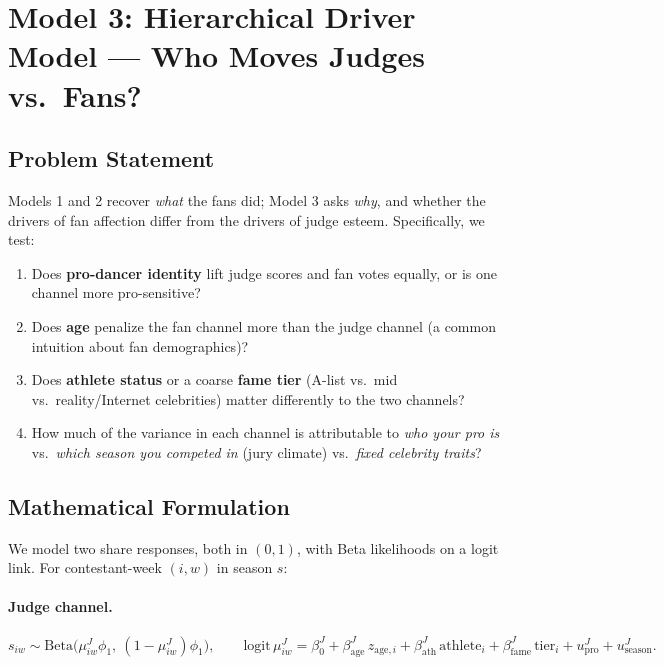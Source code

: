 \documentclass{article}
\begin{document}
\section{Model 3: Hierarchical Driver Model --- Who Moves Judges vs.\ Fans?}
\label{sec:model3}

\subsection{Problem Statement}

Models 1 and 2 recover \emph{what} the fans did; Model 3 asks \emph{why}, and whether the drivers of fan affection differ from the drivers of judge esteem. Specifically, we test:
\begin{enumerate}
  \item Does \textbf{pro-dancer identity} lift judge scores and fan votes equally, or is one channel more pro-sensitive?
  \item Does \textbf{age} penalize the fan channel more than the judge channel (a common intuition about fan demographics)?
  \item Does \textbf{athlete status} or a coarse \textbf{fame tier} (A-list vs.\ mid vs.\ reality/Internet celebrities) matter differently to the two channels?
  \item How much of the variance in each channel is attributable to \emph{who your pro is} vs.\ \emph{which season you competed in} (jury climate) vs.\ \emph{fixed celebrity traits}?
\end{enumerate}

\subsection{Mathematical Formulation}

We model two share responses, both in $(0,1)$, with Beta likelihoods on a logit link. For contestant-week $(i,w)$ in season $s$:

\paragraph{Judge channel.}
\begin{equation}
s_{iw} \sim \mathrm{Beta}\big(\mu^J_{iw}\phi_1,\ (1-\mu^J_{iw})\phi_1\big), \qquad \mathrm{logit}\,\mu^J_{iw} = \beta^J_0 + \beta^J_{\text{age}}\,z_{\text{age},i} + \beta^J_{\text{ath}}\,\mathrm{athlete}_i + \beta^J_{\text{fame}}\,\mathrm{tier}_i + u^J_{\text{pro}} + u^J_{\text{season}}.
\label{eq:m3-judge}
\end{equation}
\end{document}
